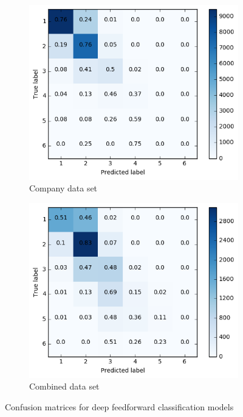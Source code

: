 \begin{figure}[h]
\begin{subfigure}{.5\textwidth}
  \includegraphics[width=.95\linewidth]{img/corp_d1_cm_retweets}
  \caption{Company data set}
  \label{fig:retw_distr_sub3}
\end{subfigure}%
\begin{subfigure}{.5\textwidth}
  \includegraphics[width=.95\linewidth]{img/comb_d1_cm_retweets}
  \caption{Combined data set}
  \label{fig:retw_distr_sub4}
\end{subfigure}%
\caption{Confusion matrices for deep feedforward classification models}
\label{fig:d1_cm}
\end{figure}

